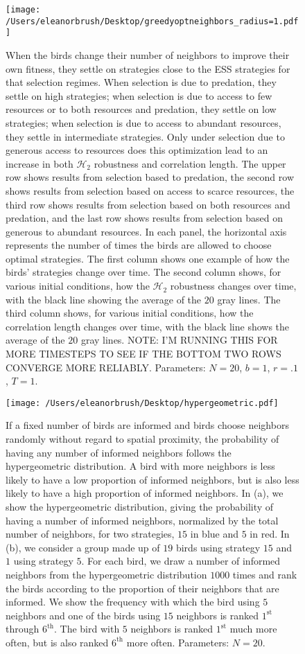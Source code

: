 \documentclass{article}
\begin{document}
\begin{figure}[ht]
\texttt{[image: /Users/eleanorbrush/Desktop/greedyoptneighbors\_radius=1.pdf]}
\caption{\label{greedyopt} When the birds change their number of neighbors to improve their own fitness, they settle on strategies close to the ESS strategies for that selection regimes. When selection is due to predation, they settle on high strategies; when selection is due to access to few resources or to both resources and predation, they settle on low strategies; when selection is due to access to abundant resources, they settle in intermediate strategies. Only under selection due to generous access to resources does this optimization lead to an increase in both $\mathscr{H}_2$ robustness and correlation length. The upper row shows results from selection based to predation, the second row shows results from selection based on access to scarce resources, the third row shows results from selection based on both resources and predation, and the last row shows results from selection based on generous to abundant resources. In each panel, the  horizontal axis represents the number of times the birds are allowed to choose optimal strategies. The first column shows one example of how the birds' strategies change over time. The second column shows, for various initial conditions, how the $\mathscr{H}_2$ robustness changes over time, with the black line showing the average of the $20$ gray lines. The third column shows, for various initial conditions, how the correlation length changes over time, with the black line shows the average of the $20$ gray lines.  {\red NOTE: I'M RUNNING THIS FOR MORE TIMESTEPS TO SEE IF THE BOTTOM TWO ROWS CONVERGE MORE RELIABLY.} Parameters:  $N=20$, $b=1$, $r=.1$, $T=1$. 
}
\end{figure}

\begin{figure}[ht]
\texttt{[image: /Users/eleanorbrush/Desktop/hypergeometric.pdf]}
\caption{\label{hypergeo} If a fixed number of birds are informed and birds choose neighbors randomly without regard to spatial proximity, the probability of having any number of informed neighbors follows the hypergeometric distribution. A bird with more neighbors is less likely to have a low proportion of informed neighbors, but is also less likely to have a high proportion of informed neighbors. In (a), we show the hypergeometric distribution, giving the probability of having a number of informed neighbors, normalized by the total number of neighbors, for two strategies, $15$ in blue and $5$ in red. In (b), we consider a group made up of $19$ birds using strategy $15$ and $1$ using strategy $5$. For each bird, we draw a number of informed neighbors from the hypergeometric distribution  $1000$ times and rank the birds according to the proportion of their neighbors that are informed. We show the frequency with which the bird using $5$ neighbors and one of the birds using $15$ neighbors is ranked $1^\text{st}$ through $6^\text{th}$. The bird with $5$ neighbors is ranked $1^\text{st}$ much more often, but is also ranked $6^\text{th}$ more often. Parameters: $N=20$. }
\end{figure}
\end{document}
